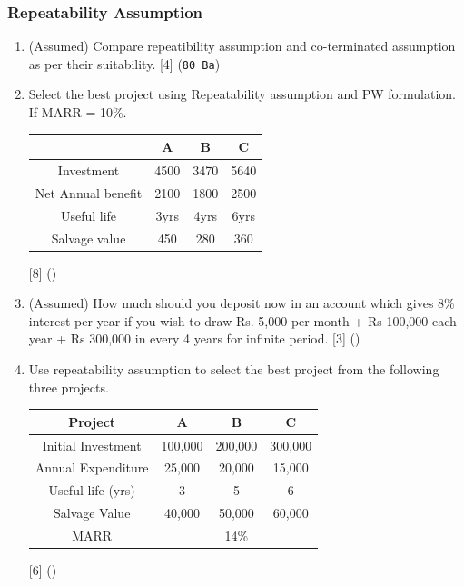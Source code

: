 \documentclass[12pt]{article}
\begin{document}
	\subsubsection{Repeatability Assumption}
	\begin{enumerate}
		\item (Assumed) Compare repeatibility assumption and co-terminated assumption as per their suitability. \hspace{14.4cm} [4] (\texttt{80 Ba})
		
		\item Select the best project using Repeatability assumption and PW formulation. If MARR = 10\%.\\
		\begin{tabular}{|c|c|c|c|}
			\hline
			& A & B & C \\ \hline
			Investment & 4500 & 3470 & 5640 \\ \hline
			Net Annual benefit & 2100 & 1800 & 2500 \\ \hline
			Useful life & 3yrs & 4yrs & 6yrs \\ \hline
			Salvage value & 450 & 280 & 360 \\ \hline
		\end{tabular}\hfill [8] ()
		
		\item (Assumed) How much should you deposit now in an account which gives 8\% interest per year if you wish to draw Rs. 5,000 per month + Rs 100,000 each year + Rs 300,000 in every 4 years for infinite period. \hfill [3] ()
		
		\item Use repeatability assumption to select the best project from the following three projects. \\
		\begin{tabular}{|c|c|c|c|}
			\hline
			Project & A & B & C \\ \hline
			Initial Investment & 100,000 & 200,000 & 300,000 \\ \hline
			Annual Expenditure & 25,000 & 20,000 & 15,000 \\ \hline
			Useful life (yrs) & 3 & 5 & 6 \\ \hline
			Salvage Value & 40,000 & 50,000 & 60,000 \\ \hline
			MARR & \multicolumn{3}{c|}{14\%} \\ \hline
		\end{tabular}\hfill [6] ()
		

\end{enumerate}
\end{document}
